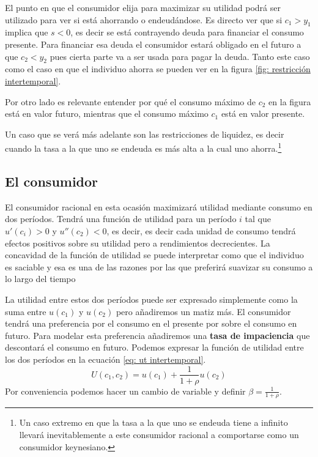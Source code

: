 El punto en que el consumidor elija para maximizar su utilidad podrá ser utilizado para ver si está ahorrando o endeudándose. Es directo ver que si $c_1>y_1$ implica que $s<0$, es decir se está contrayendo deuda para financiar el consumo presente. Para financiar esa deuda el consumidor estará obligado en el futuro a que $c_2<y_2$ pues cierta parte va a ser usada para pagar la deuda. Tanto este caso como el caso en que el individuo ahorra se pueden ver en la figura \ref{fig: restricción intertemporal}.

Por otro lado es relevante entender por qué el consumo máximo de $c_2$ en la figura está en valor futuro, mientras que el consumo máximo $c_1$ está en valor presente. 

Un caso que se verá más adelante son las restricciones de liquidez, es decir cuando la tasa a la que uno se endeuda es más alta a la cual uno ahorra.\footnote{Un caso extremo en que la tasa a la que uno se endeuda tiene a infinito llevará inevitablemente a este consumidor racional a comportarse como un consumidor keynesiano.} 

\subsection{El consumidor}

El consumidor racional en esta ocasión maximizará utilidad mediante consumo en dos períodos. Tendrá una función de utilidad para un período $i$ tal que $u'(c_i)>0$ y $u''(c_2)<0$, es decir, es decir cada unidad de consumo tendrá efectos positivos sobre su utilidad pero a rendimientos decrecientes. La concavidad de la función de utilidad se puede interpretar como que el individuo es saciable y esa es una de las razones por las que preferirá suavizar su consumo a lo largo del tiempo

La utilidad entre estos dos períodos puede ser expresado simplemente como la suma entre $u(c_1)$ y $u(c_2)$ pero añadiremos un matiz más. El consumidor tendrá una preferencia por el consumo en el presente por sobre el consumo en futuro. Para modelar esta preferencia añadiremos una \textbf{tasa de impaciencia} que descontará el consumo en futuro. Podemos expresar la función de utilidad entre los dos períodos en la ecuación \ref{eq: ut intertemporal}.
\begin{equation}
    U(c_1,c_2) = u(c_1) + \frac{1}{1+\rho} u(c_2) \label{eq: ut intertemporal}
\end{equation}
Por conveniencia podemos hacer un cambio de variable y definir $\beta = \frac{1}{1+\rho}$. 

